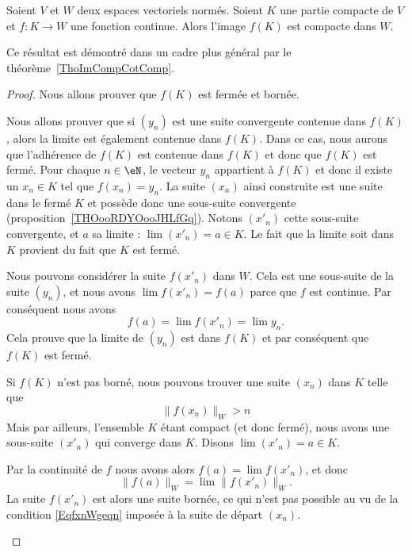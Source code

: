 \begin{proposition}		\label{PropContinueCompactBorne}
	Soient \( V\) et \( W\) deux espaces vectoriels normés. Soient \( K\) une partie compacte de \( V\) et \( f\colon K\to W\) une fonction continue. Alors l'image \( f(K)\) est compacte dans \( W\).
\end{proposition}
Ce résultat est démontré dans un cadre plus général par le théorème~\ref{ThoImCompCotComp}.

\begin{proof}
	Nous allons prouver que \( f(K)\) est fermée et bornée.
	\begin{subproof}
		 Nous allons prouver que si \( (y_n)\) est une suite convergente contenue dans \( f(K)\), alors la limite est également contenue dans \( f(K)\). Dans ce cas, nous aurons que l'adhérence de \( f(K)\) est contenue dans \( f(K)\) et donc que \( f(K)\) est fermé. Pour chaque \( n\in\eN\), le vecteur \( y_n\) appartient à \( f(K)\) et donc il existe un \( x_n\in K\) tel que \( f(x_n)=y_n\). La suite \( (x_n)\) ainsi construite est une suite dans le fermé \( K\) et possède donc une sous-suite convergente (proposition~\ref{THOooRDYOooJHLfGq}). Notons \( (x'_n)\) cette sous-suite convergente, et \( a\) sa limite : \( \lim(x'_n)=a\in K\). Le fait que la limite soit dans \( K\) provient du fait que \( K\) est fermé.

		Nous pouvons considérer la suite \( f(x'_n)\) dans \( W\). Cela est une sous-suite de la suite \( (y_n)\), et nous avons \( \lim f(x'_n)=f(a)\) parce que \( f\) est continue. Par conséquent nous avons
		\begin{equation}
			f(a)=\lim f(x'_n)=\lim y_n.
		\end{equation}
		Cela prouve que la limite de \( (y_n)\) est dans \( f(K)\) et par conséquent que \( f(K)\) est fermé.

		Si \( f(K)\) n'est pas borné, nous pouvons trouver une suite \( (x_n)\) dans \( K\) telle que
		\begin{equation}		\label{EqfxnWgeqn}
			\| f(x_n) \|_W>n
		\end{equation}
		Mais par ailleurs, l'ensemble \( K\) étant compact (et donc fermé), nous avons une sous-suite \( (x'_n)\) qui converge dans \( K\). Disons \( \lim(x'_n)=a\in K\).

		Par la continuité de \( f\) nous avons alors \( f(a)=\lim f(x'_n)\), et donc
		\begin{equation}
			\| f(a) \|_W =\lim \| f(x'_n) \|_W.
		\end{equation}
		La suite \( f(x'_n)\) est alors une suite bornée, ce qui n'est pas possible au vu de la condition \eqref{EqfxnWgeqn} imposée à la suite de départ \( (x_n)\).
	\end{subproof}
\end{proof}

